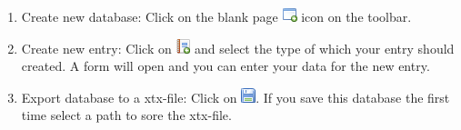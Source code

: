 \begin{enumerate}
 \item Create new database: Click on the blank page
   \includegraphics{../../images/application_add.png} icon on the toolbar.
 \item Create new entry: Click on \includegraphics{../../images/report_add.png}
   and select the type of which your entry should created. A form will open and
   you can enter your data for the new entry.
 \item Export database to a xtx-file: Click on
   \includegraphics{../../images/disk.png}. If you save this database the first
   time select a path to sore the xtx-file.
\end{enumerate}
